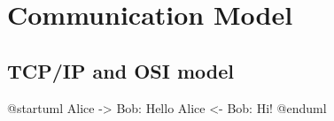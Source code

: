 \documentclass[../main.tex]{subfiles}
\begin{document}
    \chapter{Communication Model}
    \section{TCP/IP and OSI model}

\begin{plantuml}
  @startuml
  Alice -> Bob: Hello
  Alice <- Bob: Hi!
  @enduml
\end{plantuml}
\end{document}

